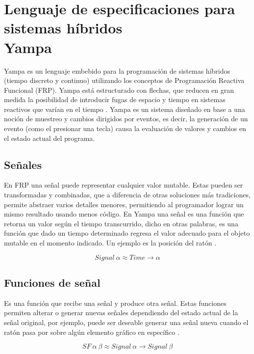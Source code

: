 \section{Lenguaje de especificaciones para sistemas híbridos\\ Yampa}

Yampa es un lenguaje embebido para la programación de sistemas híbridos (tiempo discreto y continuo) utilizando los conceptos de Programación Reactiva Funcional (FRP). Yampa está estructurado con flechas, que reducen en gran medida la posibilidad de introducir fugas de espacio y tiempo en sistemas reactivos que varían en el tiempo \cite{wiki:Yampa}. Yampa es un sistema diseñado en base a una noción de muestreo y cambios dirigidos por eventos, es decir, la generación de un evento (como el presionar una tecla) causa la evaluación de valores y cambios en el estado actual del programa.

\subsection{Señales}
En FRP una señal puede representar cualquier valor mutable. Estas pueden ser transformadas y combinadas, que a diferencia de otras soluciones más tradiciones, permite abstraer varios detalles menores, permitiendo al programador lograr un mismo resultado usando menos código. En Yampa una señal es una función que retorna un valor según el tiempo transcurrido, dicho en otras palabras, es una función que dado un tiempo determinado regresa el valor adecuado para el objeto mutable en el momento indicado. Un ejemplo es la posición del ratón \cite{wiki:Yampa} \cite{Courtney2003b}.

\begin{equation}
Signal \ \alpha \approx Time \rightarrow \alpha
\end{equation}

\subsection{Funciones de señal}
Es una función que recibe una señal y produce otra señal. Estas funciones permiten alterar o generar nuevas señales dependiendo del estado actual de la señal original, por ejemplo, puede ser deseable generar una señal nueva cuando el ratón pasa por sobre algún elemento gráfico en específico \cite{wiki:Yampa}.

\begin{equation}
SF \ \alpha \ \beta \approx Signal \ \alpha \rightarrow Signal \ \beta
\end{equation}

